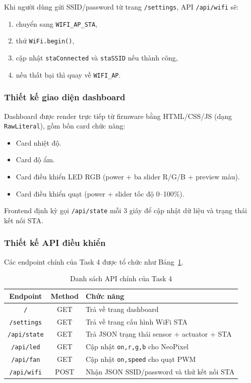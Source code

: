 Khi người dùng gửi SSID/password từ trang \texttt{/settings}, API \texttt{/api/wifi} sẽ:
\begin{enumerate}
    \item chuyển sang \texttt{WIFI\_AP\_STA},
    \item thử \texttt{WiFi.begin()},
    \item cập nhật \texttt{staConnected} và \texttt{staSSID} nếu thành công,
    \item nếu thất bại thì quay về \texttt{WIFI\_AP}.
\end{enumerate}

\subsubsection*{Thiết kế giao diện dashboard}

Dashboard được render trực tiếp từ firmware bằng HTML/CSS/JS (dạng \texttt{RawLiteral}), gồm bốn card chức năng:
\begin{itemize}
    \item Card nhiệt độ.
    \item Card độ ẩm.
    \item Card điều khiển LED RGB (power + ba slider R/G/B + preview màu).
    \item Card điều khiển quạt (power + slider tốc độ 0--100\%).
\end{itemize}

Frontend định kỳ gọi \texttt{/api/state} mỗi 3 giây để cập nhật dữ liệu và trạng thái kết nối STA.

\subsubsection*{Thiết kế API điều khiển}

Các endpoint chính của Task 4 được tổ chức như Bảng~\ref{tab:task4-api}.

\begin{table}[h!]
\centering
\caption{Danh sách API chính của Task 4}
\label{tab:task4-api}
\begin{tabular}{|c|c|p{7cm}|}
\hline
\textbf{Endpoint} & \textbf{Method} & \textbf{Chức năng} \\
\hline
\texttt{/} & GET & Trả về trang dashboard \\
\hline
\texttt{/settings} & GET & Trả về trang cấu hình WiFi STA \\
\hline
\texttt{/api/state} & GET & Trả JSON trạng thái sensor + actuator + STA \\
\hline
\texttt{/api/led} & GET & Cập nhật \texttt{on,r,g,b} cho NeoPixel \\
\hline
\texttt{/api/fan} & GET & Cập nhật \texttt{on,speed} cho quạt PWM \\
\hline
\texttt{/api/wifi} & POST & Nhận JSON SSID/password và thử kết nối STA \\
\hline
\end{tabular}
\end{table}

